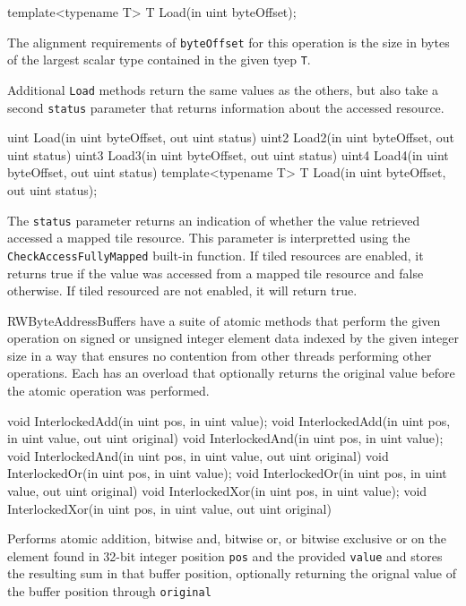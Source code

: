 \begin{HLSL}
  template<typename T>
  T Load(in uint byteOffset);
\end{HLSL}

The alignment requirements of \texttt{byteOffset} for this operation is the size in bytes of the largest
scalar type contained in the given tyep \texttt{T}.

Additional \texttt{Load} methods return the same values as the others,
but also take a second \texttt{status} parameter that returns information about the accessed resource.
\begin{HLSL}
  uint Load(in uint byteOffset, out uint status)
  uint2 Load2(in uint byteOffset, out uint status)
  uint3 Load3(in uint byteOffset, out uint status)
  uint4 Load4(in uint byteOffset, out uint status)
  template<typename T>
  T Load(in uint byteOffset, out uint status);
\end{HLSL}

The \texttt{status} parameter returns an indication of whether the value retrieved accessed a mapped tile
resource. This parameter is interpretted using the \texttt{CheckAccessFullyMapped}
built-in function. If tiled resources are enabled, it returns true if the value was accessed from a mapped
tile resource and false otherwise. If tiled resourced are not enabled, it will return true.



RWByteAddressBuffers have a suite of atomic methods that perform the given operation
on signed or unsigned integer element data indexed by the given integer size
in a way that ensures no contention from other threads performing other operations.
Each has an overload that optionally returns the original value before the atomic operation was performed.

\begin{HLSL}
   void InterlockedAdd(in uint pos, in uint value);
   void InterlockedAdd(in uint pos, in uint value, out uint original)
   void InterlockedAnd(in uint pos, in uint value);
   void InterlockedAnd(in uint pos, in uint value, out uint original)
   void InterlockedOr(in uint pos, in uint value);
   void InterlockedOr(in uint pos, in uint value, out uint original)
   void InterlockedXor(in uint pos, in uint value);
   void InterlockedXor(in uint pos, in uint value, out uint original)
\end{HLSL}

Performs atomic addition, bitwise and, bitwise or, or bitwise exclusive or
on the element found in 32-bit integer position \texttt{pos} and the provided \texttt{value}
and stores the resulting sum in that buffer position,
optionally returning the orignal value of the buffer position through \texttt{original}

